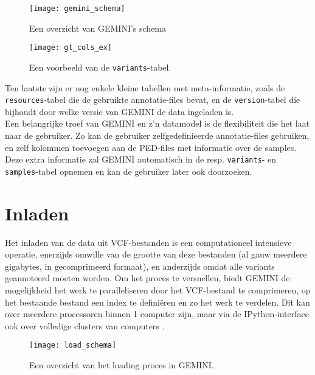 \begin{figure}[!hp]
\begin{adjustwidth}{-0.5in}{}
\texttt{[image: gemini\_schema]}
\caption{Een overzicht van GEMINI's schema \cite{10.1371/journal.pcbi.1003153}}
\label{gemini_schema_pic}
\end{adjustwidth}
\end{figure}

\begin{figure}[!h]
\texttt{[image: gt\_cols\_ex]}
\caption{Een voorbeeld van de \texttt{variants}-tabel.}
\label{gt_cols_ex}
\end{figure}

Ten laatste zijn er nog enkele kleine tabellen met meta-informatie, zoals de \texttt{resources}-tabel die de gebruikte annotatie-files bevat, en de \texttt{version}-tabel die bijhoudt door welke versie van GEMINI de data ingeladen is.\\

Een belangrijke troef van GEMINI en z'n datamodel is de flexibiliteit die het laat naar de gebruiker. Zo kan de gebruiker zelfgedefinieerde annotatie-files gebruiken, en zelf kolommen toevoegen aan de PED-files met informatie over de samples. Deze extra informatie zal GEMINI automatisch in de resp. \texttt{variants}- en \texttt{samples}-tabel opnemen en kan de gebruiker later ook doorzoeken.\\

\section{Inladen}
\label{loading_origineel}
Het inladen van de data uit VCF-bestanden is een computationeel intensieve operatie, enerzijds omwille van de grootte van deze bestanden (al gauw meerdere gigabytes, in gecomprimeerd formaat), en anderzijds omdat alle variants geannoteerd moeten worden. Om het proces te versnellen, biedt GEMINI de mogelijkheid het werk te paralleliseren door het VCF-bestand te comprimeren, op het bestaande bestand een index te defini\"eren en zo het werk te verdelen. Dit kan over meerdere processoren binnen 1 computer zijn, maar via de IPython-interface ook over volledige clusters van computers \cite{PER-GRA:2007}.\\

\begin{figure}[!h]
\texttt{[image: load\_schema]}
\caption{Een overzicht van het loading proces in GEMINI.}
\label{load_schema}
\end{figure}


